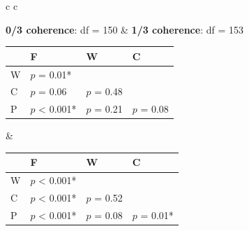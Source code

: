 \documentclass[man,floatsintext]{apa6}
\begin{document}
\begin{figure}[h]
  \begin{center}
    \begin{tabular}{ c c}

      \textbf{0/3 coherence}: df = 150 & \textbf{1/3 coherence}: df = 153\\

      {




      \small

      \begin{tabular}{| l | l |  l | l |}
        \hline
        & F              & W           & C \\
        \hline
        W & $p$ = 0.01*  &             &\\
        \hline
        C & $p$ = 0.06 &  $p$ = 0.48 & \\
        \hline
        P & $p$ < 0.001* &  $p$ = 0.21 &  $p$ = 0.08 \\
        \hline
      \end{tabular}
      } &

          {




          \small
          \begin{tabular}{| l | l |  l | l |}
            \hline
            & F               & W           & C \\
            \hline
            W &  $p$ < 0.001* &             &\\
            \hline
            C &  $p$ < 0.001* &  $p$ = 0.52 &\\
            \hline
            P &  $p$ < 0.001* &  $p$ = 0.08 &  $p$ = 0.01*\\
            \hline
          \end{tabular}
      }\\


\end{tabular}
\end{center}
\end{figure}
\end{document}
